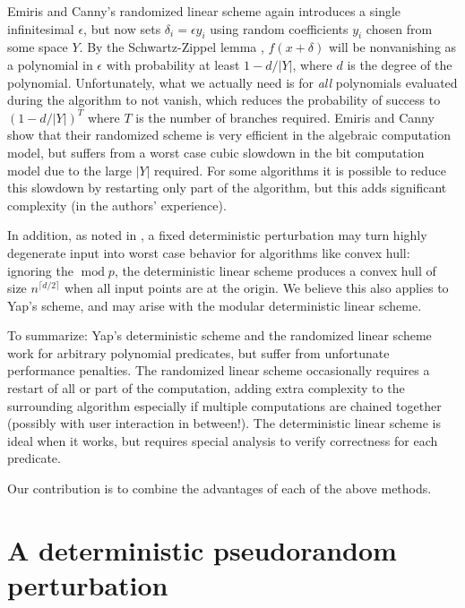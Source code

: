 \documentclass[11pt]{article}
\begin{document}
Emiris and Canny's randomized linear scheme \cite{emiris1995general} again introduces a single infinitesimal $\epsilon$, but now sets
$\delta_i = \epsilon y_i$ using random coefficients $y_i$ chosen from some space $Y$.  By the Schwartz-Zippel lemma \cite{schwartz1980fast}, $f(x+\delta)$
will be nonvanishing as a polynomial in $\epsilon$ with probability at least $1 - d/|Y|$, where $d$ is the degree of the polynomial.  Unfortunately, what we
actually need is for \emph{all} polynomials evaluated during the algorithm to not vanish, which reduces the probability of success to
$(1 - d/|Y|)^T$ where $T$ is the number of branches required.  Emiris and Canny show that their randomized scheme is very efficient in the
algebraic computation model, but suffers from a worst case cubic slowdown in the bit computation model due to the large $|Y|$ required.  For some algorithms
it is possible to reduce this slowdown by restarting only part of the algorithm, but this adds significant complexity (in the authors' experience).

In addition, as noted in \cite{burnikel1994degeneracy}, a fixed deterministic perturbation may turn highly degenerate input into worst case behavior for algorithms
like convex hull: ignoring the $\operatorname{mod} p$, the deterministic linear scheme produces a convex hull of size $n^{\lceil d/2 \rceil}$ when all input
points are at the origin.  We believe this also applies to Yap's scheme, and may arise with the modular deterministic linear scheme.

To summarize: Yap's deterministic scheme and the randomized linear scheme work for arbitrary polynomial predicates, but suffer from unfortunate performance penalties.
The randomized linear scheme occasionally requires a restart of all or part of the computation, adding extra complexity to the surrounding algorithm
especially if multiple computations are chained together (possibly with user interaction in between!).  The deterministic linear scheme is ideal when it works,
but requires special analysis to verify correctness for each predicate.

Our contribution is to combine the advantages of each of the above methods.

\section{A deterministic pseudorandom perturbation}
\end{document}
